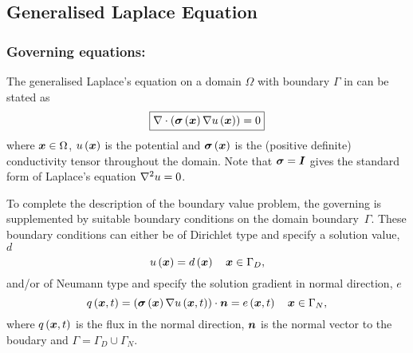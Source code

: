 \subsection{Generalised Laplace Equation}


\subsubsection{Governing equations:}

The generalised Laplace's equation on a domain $\Omega$ with boundary $\Gamma$
in \OpenCMISS can be stated as
\begin{equation}
  \boxed{
    \diverg{\pbrac{\fnof{\tensor{\sigma}}{\vect{x}}\gradient{\fnof{u}{\vect{x}}}}}=0
  }
  \label{eqn:generalisedLaplaceequation}
\end{equation}
where $\vect{x}\in\Omega$, $\fnof{u}{\vect{x}}$ is the potential and 
$\fnof{\tensor{\sigma}}{\vect{x}}$ is the (positive definite) conductivity
tensor throughout the domain. Note that $\boldsymbol{\sigma}=\boldsymbol{I}$ gives 
the standard form of Laplace's equation \ie $\nabla^{2} {u}=0$.

To complete the description of the boundary value problem,
the governing  is supplemented
by suitable boundary conditions on the domain boundary~$\Gamma$.
These boundary conditions can either be of Dirichlet type and specify a
solution value, $d$ \ie
\begin{equation}
  \fnof{u}{\vect{x}} = \fnof{d}{\vect{x}} \quad \vect{x}\in\Gamma_{D},
  \label{eqn:LaplaceDirichletBC} 
\end{equation}
and/or of Neumann type and specify the solution gradient in normal direction,
$e$ \ie
\begin{equation}
  \fnof{q}{\vect{x},t} = \dotprod{\pbrac{\fnof{\tensor{\sigma}}{\vect{x}}
      \gradient{\fnof{u}{\vect{x},t}}}}{\normal} =
  \fnof{e}{\vect{x},t} \quad \vect{x}\in\Gamma_{N},  
  \label{eqn:LaplaceNeumannBC} 
\end{equation}
where $\fnof{q}{\vect{x},t}$ is the flux in the normal direction, $\normal$ is the normal
vector to the boudary and $\Gamma = \Gamma_D \cup \Gamma_N$.

